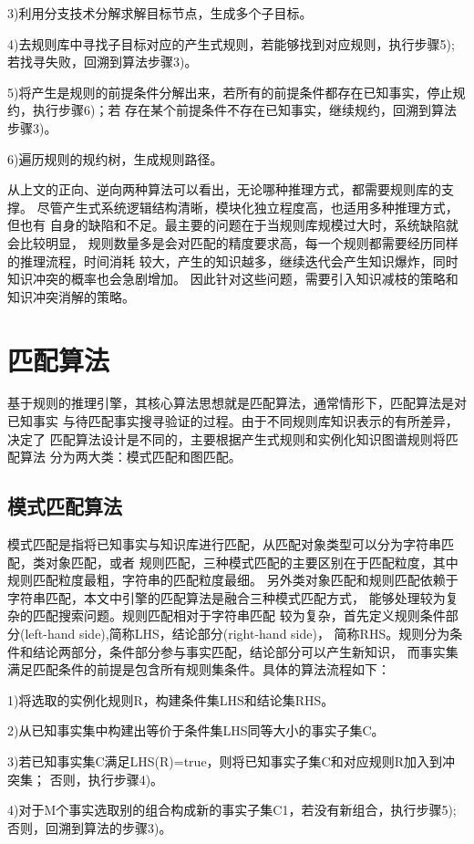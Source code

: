 \documentclass{standalone}
\begin{document}
3)利用分支技术分解求解目标节点，生成多个子目标。

4)去规则库中寻找子目标对应的产生式规则，若能够找到对应规则，执行步骤5);
若找寻失败，回溯到算法步骤3)。

5)将产生是规则的前提条件分解出来，若所有的前提条件都存在已知事实，停止规约，执行步骤6)；若
存在某个前提条件不存在已知事实，继续规约，回溯到算法步骤3)。

6)遍历规则的规约树，生成规则路径。

从上文的正向、逆向两种算法可以看出，无论哪种推理方式，都需要规则库的支撑。
尽管产生式系统逻辑结构清晰，模块化独立程度高，也适用多种推理方式，但也有
自身的缺陷和不足。最主要的问题在于当规则库规模过大时，系统缺陷就会比较明显，
规则数量多是会对匹配的精度要求高，每一个规则都需要经历同样的推理流程，时间消耗
较大，产生的知识越多，继续迭代会产生知识爆炸，同时知识冲突的概率也会急剧增加。
因此针对这些问题，需要引入知识减枝的策略和知识冲突消解的策略。
\section{匹配算法}
基于规则的推理引擎，其核心算法思想就是匹配算法，通常情形下，匹配算法是对已知事实
与待匹配事实搜寻验证的过程。由于不同规则库知识表示的有所差异，决定了
匹配算法设计是不同的，主要根据产生式规则和实例化知识图谱规则将匹配算法
分为两大类：模式匹配和图匹配。
\subsection{模式匹配算法}
模式匹配是指将已知事实与知识库进行匹配，从匹配对象类型可以分为字符串匹配，类对象匹配，或者
规则匹配，三种模式匹配的主要区别在于匹配粒度，其中规则匹配粒度最粗，字符串的匹配粒度最细。
另外类对象匹配和规则匹配依赖于字符串匹配，本文中引擎的匹配算法是融合三种模式匹配方式，
能够处理较为复杂的匹配搜索问题。规则匹配相对于字符串匹配
较为复杂，首先定义规则条件部分(left-hand side),简称LHS，结论部分(right-hand side)，
简称RHS。规则分为条件和结论两部分，条件部分参与事实匹配，结论部分可以产生新知识，
而事实集满足匹配条件的前提是包含所有规则集条件。具体的算法流程如下：

1)将选取的实例化规则R，构建条件集LHS和结论集RHS。

2)从已知事实集中构建出等价于条件集LHS同等大小的事实子集C。

3)若已知事实集C满足LHS(R)=true，则将已知事实子集C和对应规则R加入到冲突集；
否则，执行步骤4)。

4)对于M个事实选取别的组合构成新的事实子集C1，若没有新组合，执行步骤5);
否则，回溯到算法的步骤3)。
\end{document}
